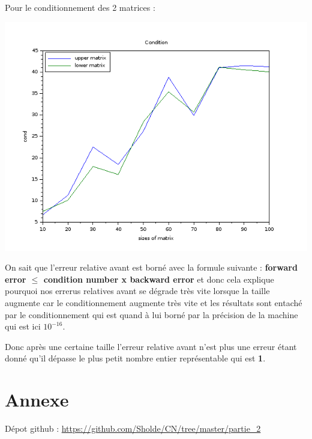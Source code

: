 \documentclass{article}
\begin{document}
Pour le conditionnement des 2 matrices :

\includegraphics[scale=0.5]{img/condb.png}

On sait que l'erreur relative avant est borné avec la formule suivante
: \textbf{forward error $\le$ condition number x backward error} et
donc cela explique pourquoi nos errerus relatives avant se
dégrade très vite lorsque la taille augmente car le conditionnement
augmente très vite et les résultats sont entaché par le
conditionnement qui est quand à lui borné par la précision de la
machine qui est ici $10^{-16}$. \newline

Donc après une certaine taille l'erreur relative avant n'est plus une
erreur étant donné qu'il dépasse le plus petit nombre entier
représentable qui est \textbf{1}.

\section*{Annexe}

Dépot github : \url{https://github.com/Sholde/CN/tree/master/partie_2}
\end{document}
